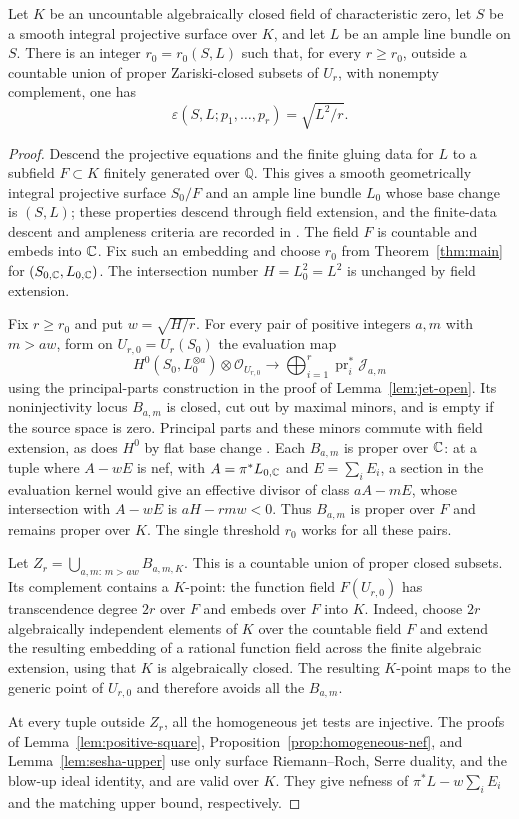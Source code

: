 \begin{corollary}\label{cor:fields}
Let $K$ be an uncountable algebraically closed field of characteristic
zero, let $S$ be a smooth integral projective surface over $K$, and let
$L$ be an ample line bundle on $S$. There is an integer $r_0=r_0(S,L)$
such that, for every $r\ge r_0$, outside a countable union of proper
Zariski-closed subsets of $U_r$, with nonempty complement, one has
\[
 \varepsilon(S,L;p_1,\ldots,p_r)=\sqrt{L^2/r}.
\]
\end{corollary}
\begin{proof}
Descend the projective equations and the finite gluing data for $L$ to
a subfield $F\subset K$ finitely generated over $\mathbb Q$. This gives
a smooth geometrically integral projective surface $S_0/F$ and an ample
line bundle $L_0$ whose base change is $(S,L)$; these properties descend
through field extension, and the finite-data descent and ampleness
criteria are recorded in \cite[Tags 01ZM and 0D3C]{Stacks}.
The field $F$ is countable and embeds into $\mathbb C$. Fix such an embedding
and choose $r_0$ from Theorem~\ref{thm:main} for $(S_{0,\mathbb C},L_{0,\mathbb C})$.
The intersection number $H=L_0^2=L^2$ is unchanged by field extension.

Fix $r\ge r_0$ and put $w=\sqrt{H/r}$. For every pair of positive
integers $a,m$ with $m>aw$, form on $U_{r,0}=U_r(S_0)$ the evaluation map
\[
 H^0(S_0,L_0^{\otimes a})\otimes\mathcal O_{U_{r,0}}
 \longrightarrow
 \bigoplus_{i=1}^r\operatorname{pr}_i^*\mathcal J_{a,m}
\]
using the principal-parts construction in the proof of
Lemma~\ref{lem:jet-open}. Its noninjectivity locus $B_{a,m}$ is closed,
cut out by maximal minors, and is empty if the source space is zero.
Principal parts and these minors commute with field extension, as does
$H^0$ by flat base change \cite[Tag 02KH]{Stacks}.
Each $B_{a,m}$ is proper over $\mathbb C$: at a tuple where
$A-wE$ is nef, with $A=\pi^*L_{0,\mathbb C}$ and $E=\sum_iE_i$, a section in
the evaluation kernel would give an effective divisor of class $aA-mE$,
whose intersection with $A-wE$ is $aH-rmw<0$.
Thus $B_{a,m}$ is proper over $F$ and remains proper over $K$.
The single threshold $r_0$ works for all these pairs.

Let $Z_r=\bigcup_{a,m:\,m>aw}B_{a,m,K}$. This is a countable union of
proper closed subsets. Its complement contains a $K$-point: the
function field $F(U_{r,0})$ has transcendence degree $2r$ over $F$ and
embeds over $F$ into $K$. Indeed, choose $2r$ algebraically independent
elements of $K$ over the countable field $F$ and extend the resulting
embedding of a rational function field across the finite algebraic
extension, using that $K$ is algebraically closed. The resulting
$K$-point maps to the generic point of $U_{r,0}$ and therefore avoids
all the $B_{a,m}$.

At every tuple outside $Z_r$, all the homogeneous jet tests are
injective. The proofs of Lemma~\ref{lem:positive-square},
Proposition~\ref{prop:homogeneous-nef}, and Lemma~\ref{lem:sesha-upper}
use only surface Riemann--Roch, Serre duality, and the blow-up ideal
identity, and are valid over $K$. They give nefness of
$\pi^*L-w\sum_iE_i$ and the matching upper bound, respectively.
\end{proof}
